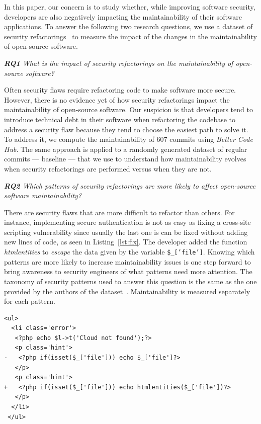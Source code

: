 \documentclass[10pt,conference]{IEEEtran}
\newcounter{lstannotation}
\begin{document}
In this paper, our concern is to study whether, while improving software
security, developers are also negatively impacting the maintainability of their
software applications. To answer the following two research questions, we use a
dataset of security refactorings~\cite{Reis:2017:IJSSE} to measure the impact of
the changes in the maintainability of open-source software.

\begin{framed}
\textit{\textbf{RQ1} What is the impact of security refactorings on the
maintainability of open-source software?}
\end{framed}

Often security flaws require refactoring code to make software more secure.
However, there is no evidence yet of how security refactorings impact the
maintainability of open-source software. Our suspicion is that developers tend
to introduce technical debt in their software when refactoring the codebase to
address a security flaw because they tend to choose the easiest path to solve
it. To address it, we compute the maintainability of $607$ commits using
\emph{Better Code Hub}. The same approach is applied to a randomly generated
dataset of regular commits --- baseline --- that we use to understand how
maintainability evolves when security refactorings are performed versus when
they are not.

\begin{framed}
\textit{\textbf{RQ2} Which patterns of security refactorings are more likely to
affect open-source software maintainability?}
\end{framed}

There are security flaws that are more difficult to refactor than others. For
instance, implementing secure authentication is not as easy as fixing a
cross-site scripting vulnerability since usually the last one is can be fixed
without adding new lines of code, as seen in Listing~\ref{lst:fix}. The developer added the function \emph{htmlentities} to
\textit{escape} the data given by the variable \texttt{\$\_['file']}. Knowing which
patterns are more likely to increase maintainability issues is one step forward
to bring awareness to security engineers of what patterns need more attention.
The taxonomy of security patterns used to answer this question is the same as
the one provided by the authors of the dataset~\cite{Reis:2017:IJSSE}.
Maintainability is measured separately for each pattern.

\setcounter{lstannotation}{0}
\begin{lstlisting}[style={PHPStyle}, caption={Fix provided by \texttt{nextcloud/server} developers to a \\Cross-Site Scripting vulnerability},label={lst:fix}]
 <ul>
  <li class='error'>
   <?php echo $l->t('Cloud not found');?>
   <p class='hint'>
-   <?php if(isset($_['file'])) echo $_['file']?>
   </p>
   <p class='hint'>
+   <?php if(isset($_['file'])) echo htmlentities($_['file'])?>
   </p>
  </li>
 </ul>

\end{lstlisting}
\end{document}
